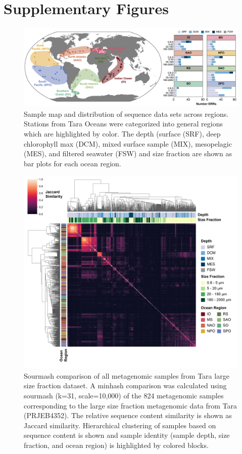 \documentclass[12pt]{article}
\numberwithin{equation}{section}
\begin{document}
\section*{Supplementary Figures}

\begin{landscape}
\begin{figure}
    \centering
    \includegraphics[width=0.95\columnwidth]{si-figures/Tara_stationMap-01.png}
    \caption{Sample map and distribution of sequence data sets across regions. Stations from Tara Oceans were categorized into general regions which are highlighted by color. The depth (surface (SRF), deep chlorophyll max (DCM), mixed surface sample (MIX), mesopelagic (MES), and filtered seawater (FSW) and size fraction are shown as bar plots for each ocean region. }
    \label{fig:tara-map}
\end{figure}
\end{landscape}

\begin{figure}
    \centering
    \includegraphics[width=0.95\columnwidth]{si-figures/modified-sourmash-region-size_depth-01.png}
    \caption{Sourmash comparison of all metagenomic samples from Tara large size fraction dataset. A minhash comparison was calculated using sourmash (k=31, scale=10,000) of the 824 metagenomic samples corresponding to the large size fraction metagenomic data from Tara (PRJEB4352). The relative sequence content similarity is shown as Jaccard similarity. Hierarchical clustering of samples based on sequence content is shown and sample identity (sample depth, size fraction, and ocean region) is highlighted by colored blocks.}
    \label{fig:sourmash}
\end{figure}
\end{document}
